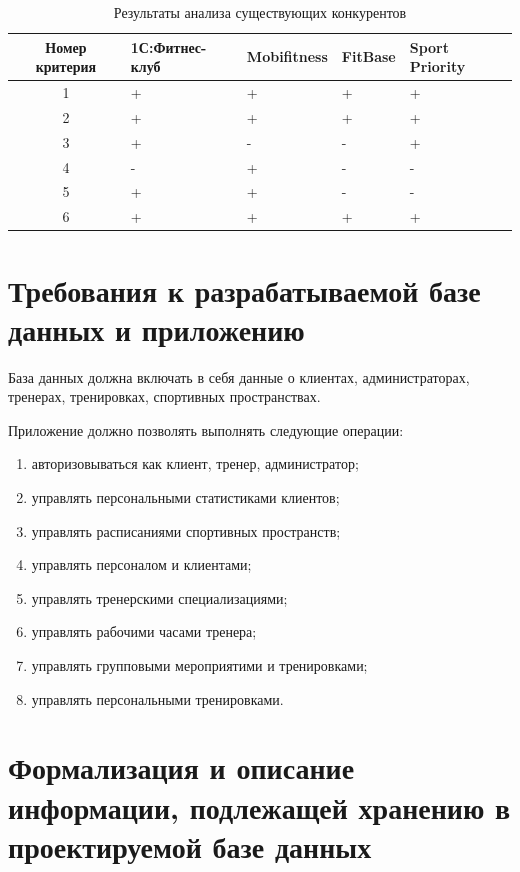 \begin{table}[H]
	\centering
	\caption{Результаты анализа существующих конкурентов}
	\begin{tabular}{|c|p{3cm}|p{3cm}|p{2cm}|p{3cm}|}
	\hline
	Номер критерия & 1С:Фитнес-клуб & Mobifitness & FitBase & Sport Priority \\
	\hline
	1 & + & + & + & + \\
	\hline
	2 & + & + & + & + \\
	\hline
	3 & + & - & - & + \\
	\hline
	4 & - & + & - & - \\
	\hline
	5 & + & + & - & - \\
	\hline
	6 & + & + & + & + \\
	\hline
	\end{tabular}
	\label{tab:anal}
\end{table}

\section{Требования к разрабатываемой базе данных и приложению}

База данных должна включать в себя данные о клиентах, администраторах, тренерах, тренировках,
спортивных пространствах.

Приложение должно позволять выполнять следующие операции:

\begin{enumerate}
	\item авторизовываться как клиент, тренер, администратор;
	\item управлять персональными статистиками клиентов;
	\item управлять расписаниями спортивных пространств;
	\item управлять персоналом и клиентами;
	\item управлять тренерскими специализациями;
	\item управлять рабочими часами тренера;
	\item управлять групповыми мероприятими и тренировками;
	\item управлять персональными тренировками.
\end{enumerate}

\section{Формализация и описание информации, подлежащей хранению в проектируемой базе данных}

